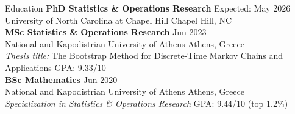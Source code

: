 \documentclass{resume} %
\begin{document}


\begin{rSection}{Education}
{\bf PhD Statistics \& Operations Research} \hfill {Expected: May 2026}\\
University of North Carolina at Chapel Hill \hfill Chapel Hill, NC \\


{\bf MSc Statistics \& Operations Research} \hfill {Jun 2023}\\
National and Kapodistrian University of Athens \hfill Athens, Greece \\
\textit{Thesis title:} The Bootstrap Method for Discrete-Time Markov Chains and Applications \hfill {GPA: 9.33/10} \\

{\bf BSc Mathematics} \hfill {Jun 2020}\\
National and Kapodistrian University of Athens \hfill Athens, Greece\\
\textit{Specialization in Statistics \& Operations Research} \hfill GPA: 9.44/10 (top $1.2\%$)
\end{rSection}
\end{document}
